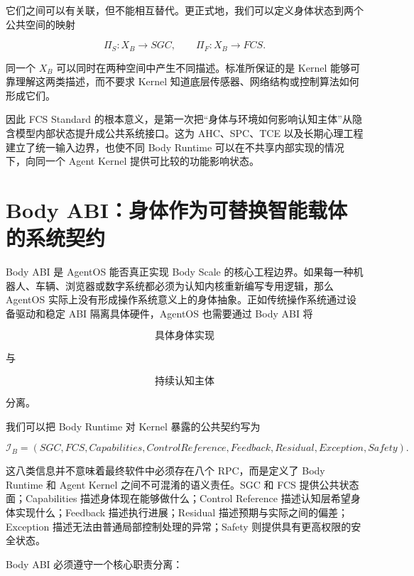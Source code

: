 \begin{statementbox}
\centering
{}
\end{statementbox}

它们之间可以有关联，但不能相互替代。更正式地，我们可以定义身体状态到两个公共空间的映射

\[
\Pi_S:
X_B\rightarrow SGC,
\qquad
\Pi_F:
X_B\rightarrow FCS.
\]

同一个 $X_B$ 可以同时在两种空间中产生不同描述。标准所保证的是 Kernel 能够可靠理解这两类描述，而不要求 Kernel 知道底层传感器、网络结构或控制算法如何形成它们。

因此 FCS Standard 的根本意义，是第一次把``身体与环境如何影响认知主体''从隐含模型内部状态提升成公共系统接口。这为 AHC、SPC、TCE 以及长期心理工程建立了统一输入边界，也使不同 Body Runtime 可以在不共享内部实现的情况下，向同一个 Agent Kernel 提供可比较的功能影响状态。

\section{Body ABI：身体作为可替换智能载体的系统契约}

Body ABI 是 AgentOS 能否真正实现 Body Scale 的核心工程边界。如果每一种机器人、车辆、浏览器或数字系统都必须为认知内核重新编写专用逻辑，那么 AgentOS 实际上没有形成操作系统意义上的身体抽象。正如传统操作系统通过设备驱动和稳定 ABI 隔离具体硬件，AgentOS 也需要通过 Body ABI 将

\[
\text{具体身体实现}
\]

与

\[
\text{持续认知主体}
\]

分离。

我们可以把 Body Runtime 对 Kernel 暴露的公共契约写为

\[
\mathcal I_B
=
(
SGC,
FCS,
Capabilities,
ControlReference,
Feedback,
Residual,
Exception,
Safety
).
\]

这八类信息并不意味着最终软件中必须存在八个 RPC，而是定义了 Body Runtime 和 Agent Kernel 之间不可混淆的语义责任。SGC 和 FCS 提供公共状态面；Capabilities 描述身体现在能够做什么；Control Reference 描述认知层希望身体实现什么；Feedback 描述执行进展；Residual 描述预期与实际之间的偏差；Exception 描述无法由普通局部控制处理的异常；Safety 则提供具有更高权限的安全状态。

Body ABI 必须遵守一个核心职责分离：

\begin{statementbox}
\centering
{}
\end{statementbox}

